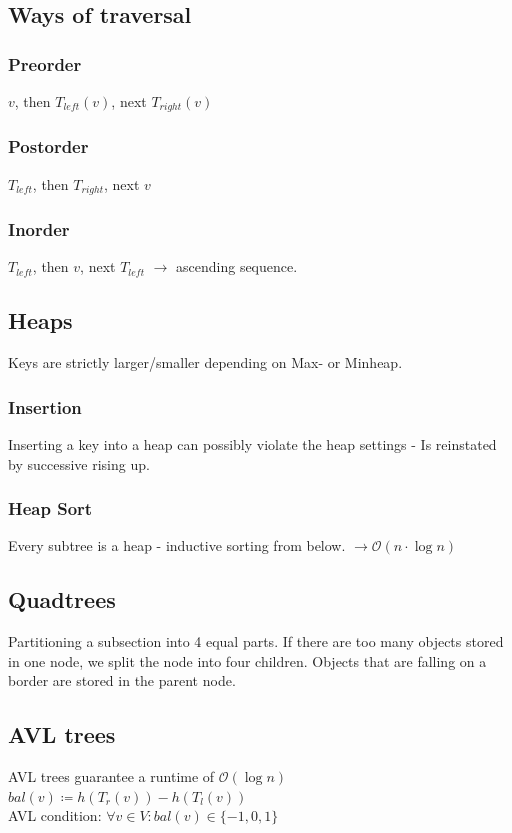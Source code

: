 \documentclass[10pt,landscape,a4paper, table]{extarticle}
\begin{document}
\begin{multicols*}{3}
\subsection{Ways of traversal}
\subsubsection{Preorder}
$v$, then $T_{left}(v)$, next $T_{right}(v)$
\subsubsection{Postorder}
$T_{left}$, then $T_{right}$, next $v$
\subsubsection{Inorder}
$T_{left}$, then $v$, next $T_{left}$ $\rightarrow$ ascending sequence.

\subsection{Heaps}
Keys are strictly larger/smaller depending on Max- or Minheap.
\subsubsection{Insertion}
Inserting a key into a heap can possibly violate the heap settings - Is reinstated by successive rising up. 
\subsubsection{Heap Sort}
Every subtree is a heap - inductive sorting from below. $\rightarrow \mathcal{O}(n\cdot \log n)$


\subsection{Quadtrees}
Partitioning a subsection into 4 equal parts. If there are too many objects stored in one node, we split the node into four children. Objects that are falling on a border are stored in the parent node.

\subsection{AVL trees}
AVL trees guarantee a runtime of $\mathcal{O}(\log n)$\\
$bal (v) \coloneqq h(T_r(v))-h(T_l(v))$\\
AVL condition: $\forall v \in V: bal(v) \in \{-1,0,1\}$


\end{multicols*}
\end{document}
